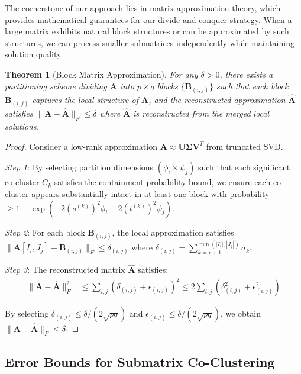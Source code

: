 \documentclass[journal]{IEEEtran}
\newtheorem{theorem}{Theorem}
\begin{document}
The cornerstone of our approach lies in matrix approximation theory, which provides mathematical guarantees for our divide-and-conquer strategy. When a large matrix exhibits natural block structures or can be approximated by such structures, we can process smaller submatrices independently while maintaining solution quality.

\begin{theorem}[Block Matrix Approximation]
    \label{thm:block-matrix-approximation}
    For any $\delta > 0$, there exists a partitioning scheme dividing $\mathbf{A}$ into $p \times q$ blocks $\{\mathbf{B}_{(i,j)}\}$ such that each block $\mathbf{B}_{(i,j)}$ captures the local structure of $\mathbf{A}$, and the reconstructed approximation $\hat{\mathbf{A}}$ satisfies $\|\mathbf{A} - \hat{\mathbf{A}}\|_F \le \delta$ where $\hat{\mathbf{A}}$ is reconstructed from the merged local solutions.
\end{theorem}

\begin{proof}
    Consider a low-rank approximation $\mathbf{A} \approx \mathbf{U}\mathbf{\Sigma}\mathbf{V}^T$ from truncated SVD.

    \textit{Step 1}: By selecting partition dimensions $(\phi_i \times \psi_j)$ such that each significant co-cluster $C_k$ satisfies the containment probability bound, we ensure each co-cluster appears substantially intact in at least one block with probability $\geq 1 - \exp(-2(s^{(k)})^2\phi_i - 2(t^{(k)})^2\psi_j)$.

    \textit{Step 2}: For each block $\mathbf{B}_{(i,j)}$, the local approximation satisfies $\|\mathbf{A}[I_i, J_j] - \mathbf{B}_{(i,j)}\|_F \leq \delta_{(i,j)}$ where $\delta_{(i,j)} = \sum_{k=r+1}^{\min(|I_i|,|J_j|)} \sigma_k$.

    \textit{Step 3}: The reconstructed matrix $\hat{\mathbf{A}}$ satisfies:
    \begin{align}
        \|\mathbf{A} - \hat{\mathbf{A}}\|_F^2 & \leq \sum_{i,j} (\delta_{(i,j)} + \epsilon_{(i,j)})^2 \leq 2\sum_{i,j} (\delta_{(i,j)}^2 + \epsilon_{(i,j)}^2)
    \end{align}

    By selecting $\delta_{(i,j)} \leq \delta/(2\sqrt{pq})$ and $\epsilon_{(i,j)} \leq \delta/(2\sqrt{pq})$, we obtain $\|\mathbf{A} - \hat{\mathbf{A}}\|_F \leq \delta$.
\end{proof}

\subsection{Error Bounds for Submatrix Co-Clustering}
\end{document}
